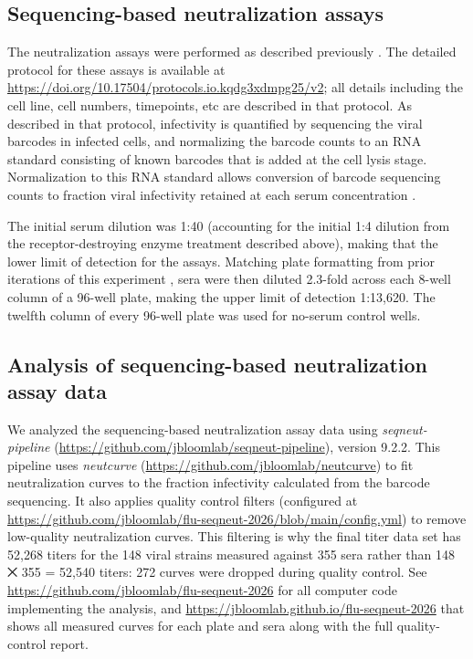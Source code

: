 \subsection{Sequencing-based neutralization assays}

The neutralization assays were performed as described previously \citep{kikawa2025,kikawa2026a}. The detailed protocol for these assays is available at \href{https://doi.org/10.17504/protocols.io.kqdg3xdmpg25/v2}{https://doi.org/10.17504/protocols.io.kqdg3xdmpg25/v2}; all details including the cell line, cell numbers, timepoints, etc are described in that protocol. As described in that protocol, infectivity is quantified by sequencing the viral barcodes in infected cells, and normalizing the barcode counts to an RNA standard consisting of known barcodes that is added at the cell lysis stage. Normalization to this RNA standard allows conversion of barcode sequencing counts to fraction viral infectivity retained at each serum concentration \citep{loes2024}.

The initial serum dilution was 1:40 (accounting for the initial 1:4 dilution from the receptor-destroying enzyme treatment described above), making that the lower limit of detection for the assays. Matching plate formatting from prior iterations of this experiment \citep{kikawa2025,kikawa2026a}, sera were then diluted 2.3-fold across each 8-well column of a 96-well plate, making the upper limit of detection 1:13,620. The twelfth column of every 96-well plate was used for no-serum control wells.

\subsection{Analysis of sequencing-based neutralization assay data}

We analyzed the sequencing-based neutralization assay data using \emph{seqneut-pipeline} (\href{https://github.com/jbloomlab/seqneut-pipeline}{https://github.com/jbloomlab/seqneut-pipeline}), version 9.2.2. This pipeline uses \emph{neutcurve} (\href{https://github.com/jbloomlab/neutcurve}{https://github.com/jbloomlab/neutcurve}) to fit neutralization curves to the fraction infectivity calculated from the barcode sequencing. It also applies quality control filters (configured at \href{https://github.com/jbloomlab/flu-seqneut-2026/blob/main/config.yml}{https://github.com/jbloomlab/flu-seqneut-2026/blob/main/config.yml}) to remove low-quality neutralization curves. This filtering is why the final titer data set has 52,268 titers for the 148 viral strains measured against 355 sera rather than 148 ⨉ 355 = 52,540 titers: 272 curves were dropped during quality control. See \href{https://github.com/jbloomlab/flu-seqneut-2026}{https://github.com/jbloomlab/flu-seqneut-2026} for all computer code implementing the analysis, and \href{https://jbloomlab.github.io/flu-seqneut-2026}{https://jbloomlab.github.io/flu-seqneut-2026} that shows all measured curves for each plate and sera along with the full quality-control report.

